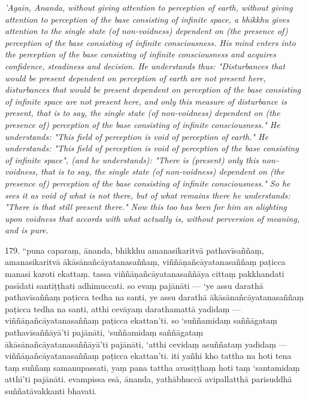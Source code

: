\documentclass[12pt]{article}
\begin{document}
\begin{paracol}{2}
\begin{column}
{\itshape\footnotesize 'Again, Ananda, without giving attention to perception of earth, without giving attention to perception of the base consisting of infinite space, a bhikkhu gives attention to the single state (of non-voidness) dependent on (the presence of) perception of the base consisting of infinite consciousness. His mind enters into the perception of the base consisting of infinite consciousness and acquires confidence, steadiness and decision. He understands thus: "Disturbances that would be present dependent on perception of earth are not present here, disturbances that would be present dependent on perception of the base consisting of infinite space are not present here, and only this measure of disturbance is present, that is to say, the single state (of non-voidness) dependent on (the presence of) perception of the base consisting of infinite consciousness." He understands: "This field of perception is void of perception of earth." He understands: "This field of perception is void of perception of the base consisting of infinite space", (and he understands): "There is (present) only this non-voidness, that is to say, the single state (of non-voidness) dependent on (the presence of) perception of the base consisting of infinite consciousness." So he sees it as void of what is not there, but of what remains there he understands: "There is that still present there." Now this too has been for him an alighting upon voidness that accords with what actually is, without perversion of meaning, and is pure.}
\switchcolumn
	\begin{flushleft}
179. “puna caparaṃ, ānanda, bhikkhu amanasikaritvā pathavīsaññaṃ, amanasikaritvā ākāsānañcāyatanasaññaṃ, viññāṇañcāyatanasaññaṃ paṭicca manasi karoti ekattaṃ. tassa viññāṇañcāyatanasaññāya cittaṃ pakkhandati pasīdati santiṭṭhati adhimuccati. so evaṃ pajānāti — ‘ye assu darathā pathavīsaññaṃ paṭicca tedha na santi, ye assu darathā ākāsānañcāyatanasaññaṃ paṭicca tedha na santi, atthi cevāyaṃ darathamattā yadidaṃ — viññāṇañcāyatanasaññaṃ paṭicca ekattan’ti. so ‘suññamidaṃ saññāgataṃ pathavīsaññāyā’ti pajānāti, ‘suññamidaṃ saññāgataṃ ākāsānañcāyatanasaññāyā’ti pajānāti, ‘atthi cevidaṃ asuññataṃ yadidaṃ — viññāṇañcāyatanasaññaṃ paṭicca ekattan’ti. iti yañhi kho tattha na hoti tena taṃ suññaṃ samanupassati, yaṃ pana tattha avasiṭṭhaṃ hoti taṃ ‘santamidaṃ atthī’ti pajānāti. evampissa esā, ānanda, yathābhuccā avipallatthā parisuddhā suññatāvakkanti bhavati.
\switchcolumn*
	\end{flushleft}

\end{column}
\end{paracol}
\end{document}
